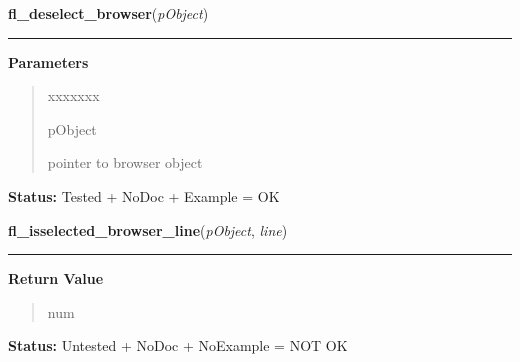\hspace{.8\funcindent}\begin{boxedminipage}{\funcwidth}

    \raggedright \textbf{fl\_deselect\_browser}(\textit{pObject})

    \vspace{-1.5ex}

    \rule{\textwidth}{0.5\fboxrule}
\setlength{\parskip}{2ex}
\setlength{\parskip}{1ex}
      \textbf{Parameters}
      \vspace{-1ex}

      \begin{quote}
        \begin{Ventry}{xxxxxxx}

          \item[pObject]

          pointer to browser object

        \end{Ventry}

      \end{quote}

\textbf{Status:} Tested + NoDoc + Example = OK



    \end{boxedminipage}

    \label{xformslib:library:fl_isselected_browser_line}

    \vspace{0.5ex}

\hspace{.8\funcindent}\begin{boxedminipage}{\funcwidth}

    \raggedright \textbf{fl\_isselected\_browser\_line}(\textit{pObject}, \textit{line})

    \vspace{-1.5ex}

    \rule{\textwidth}{0.5\fboxrule}
\setlength{\parskip}{2ex}
\setlength{\parskip}{1ex}
      \textbf{Return Value}
    \vspace{-1ex}

      \begin{quote}
      num

      \end{quote}

\textbf{Status:} Untested + NoDoc + NoExample = NOT OK



    \end{boxedminipage}

